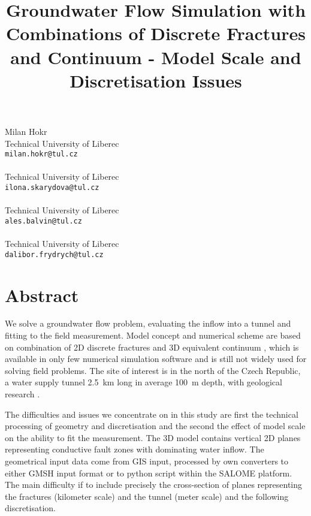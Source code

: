 \title{Groundwater Flow Simulation with Combinations of Discrete Fractures and Continuum - Model Scale and Discretisation Issues}
\author{}  \institute{}
\maketitle
\begin{center}
{\large Milan Hokr}\\
Technical University of Liberec\\
{\tt milan.hokr@tul.cz}
\\ \\
Technical University of Liberec\\
{\tt ilona.skarydova@tul.cz}
\\ \\
Technical University of Liberec\\
{\tt ales.balvin@tul.cz}
\\ \\
Technical University of Liberec\\
{\tt dalibor.frydrych@tul.cz}

\end{center}

\section*{Abstract}

We solve a groundwater flow problem, evaluating the inflow into a tunnel and fitting to the field measurement. 
Model concept and numerical scheme are based on combination of 2D discrete fractures and 3D equivalent continuum \cite{Mar08}, which is available in only few numerical simulation software and is still not widely used for solving field problems.
The site of interest is in the north of the Czech Republic, a water supply tunnel 2.5~km long in average 100~m depth, with geological research \cite{klom2010}.

The difficulties and issues we concentrate on in this study are first the technical processing of geometry and discretisation and the second the effect of model scale on the ability to fit the measurement.
 The 3D model contains vertical 2D planes representing conductive fault zones with dominating water inflow. The geometrical input data come from GIS input, processed by own converters to either GMSH input format or to python script within the SALOME platform. The main difficulty if to include precisely the cross-section of planes representing the fractures (kilometer scale) and the tunnel (meter scale) and the following discretisation.

